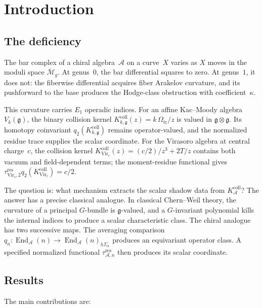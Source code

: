 \documentclass[11pt,reqno]{amsart}
\theoremstyle{definition}
\theoremstyle{remark}
\newcommand{\cA}{\mathcal{A}}
\newcommand{\Mbar}{\overline{\mathcal{M}}}
\newcommand{\fg}{\mathfrak{g}}
\newcommand{\Eone}{E_1}
\numberwithin{equation}{section}
\begin{document}
\setcounter{tocdepth}{2}
\tableofcontents


\section{Introduction}\label{sec:intro}

\subsection{The deficiency}
The bar complex of a chiral algebra~$\cA$ on a curve~$X$
varies as $X$ moves in the moduli space $\Mbar_g$.
At genus~$0$, the bar differential squares to zero.
At genus~$1$, it does not: the fiberwise differential acquires
fiber Arakelov curvature, and its pushforward to the base produces
the Hodge-class obstruction with coefficient~$\kappa$.

This curvature carries $\Eone$ operadic indices.  For an affine
Kac--Moody algebra $V_k(\fg)$, the binary collision kernel
$K_{k,\fg}^{\mathrm{coll}}(z)=k\,\Omega_{\mathrm{tr}}/z$ is valued in
$\fg\otimes\fg$.  Its homotopy coinvariant
$q_2(K_{k,\fg}^{\mathrm{coll}})$ remains operator-valued, and the
normalized residue trace supplies the scalar coordinate.  For the
Virasoro algebra at central charge~$c$, the collision kernel
$K_{\mathrm{Vir}_c}^{\mathrm{coll}}(z)=(c/2)/z^3+2T/z$ contains both
vacuum and field-dependent terms; the moment-residue functional gives
$\tau_{\mathrm{Vir}_c,2}^{\mathrm{res}}q_2
(K_{\mathrm{Vir}_c}^{\mathrm{coll}})=c/2$.

The question is: what mechanism extracts the scalar shadow data from
$K_\cA^{\mathrm{coll}}$?
The answer has a precise classical analogue. In classical
Chern--Weil theory, the curvature of a principal $G$-bundle is
$\fg$-valued, and a $G$-invariant polynomial kills the
internal indices to produce a scalar characteristic class.
The chiral analogue has two successive maps.  The averaging comparison
$q_n\colon\operatorname{End}_\cA(n)\to
\operatorname{End}_\cA(n)_{h\Sigma_n}$ produces an equivariant operator
class.  A specified normalized functional
$\tau_{\cA,n}^{\mathrm{res}}$ then produces its scalar coordinate.

\subsection{Results}
The main contributions are:
\end{document}
